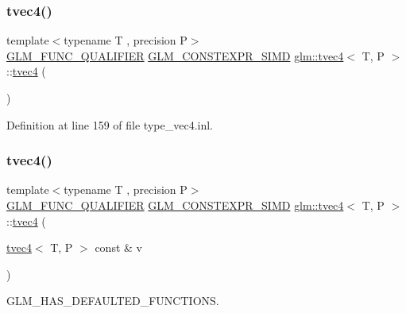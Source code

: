 \subsubsection{\texorpdfstring{tvec4()}{tvec4()}\hspace{0.1cm}{\footnotesize\ttfamily [1/35]}}
{\footnotesize\ttfamily template$<$typename T , precision P$>$ \\
\mbox{\hyperlink{setup_8hpp_a33fdea6f91c5f834105f7415e2a64407}{G\+L\+M\+\_\+\+F\+U\+N\+C\+\_\+\+Q\+U\+A\+L\+I\+F\+I\+ER}} \mbox{\hyperlink{setup_8hpp_ae5de828d10226b21e2123dd61f3cb5ed}{G\+L\+M\+\_\+\+C\+O\+N\+S\+T\+E\+X\+P\+R\+\_\+\+S\+I\+MD}} \mbox{\hyperlink{structglm_1_1tvec4}{glm\+::tvec4}}$<$ T, P $>$\+::\mbox{\hyperlink{structglm_1_1tvec4}{tvec4}} (\begin{DoxyParamCaption}{ }\end{DoxyParamCaption})}



Definition at line 159 of file type\+\_\+vec4.\+inl.

\mbox{\label{structglm_1_1tvec4_a63f627d6a023b26259e749afc7253f2c}} 
\subsubsection{\texorpdfstring{tvec4()}{tvec4()}\hspace{0.1cm}{\footnotesize\ttfamily [2/35]}}
{\footnotesize\ttfamily template$<$typename T , precision P$>$ \\
\mbox{\hyperlink{setup_8hpp_a33fdea6f91c5f834105f7415e2a64407}{G\+L\+M\+\_\+\+F\+U\+N\+C\+\_\+\+Q\+U\+A\+L\+I\+F\+I\+ER}} \mbox{\hyperlink{setup_8hpp_ae5de828d10226b21e2123dd61f3cb5ed}{G\+L\+M\+\_\+\+C\+O\+N\+S\+T\+E\+X\+P\+R\+\_\+\+S\+I\+MD}} \mbox{\hyperlink{structglm_1_1tvec4}{glm\+::tvec4}}$<$ T, P $>$\+::\mbox{\hyperlink{structglm_1_1tvec4}{tvec4}} (\begin{DoxyParamCaption}\item[{\mbox{\hyperlink{structglm_1_1tvec4}{tvec4}}$<$ T, P $>$ const \&}]{v }\end{DoxyParamCaption})}



G\+L\+M\+\_\+\+H\+A\+S\+\_\+\+D\+E\+F\+A\+U\+L\+T\+E\+D\+\_\+\+F\+U\+N\+C\+T\+I\+O\+NS. 



